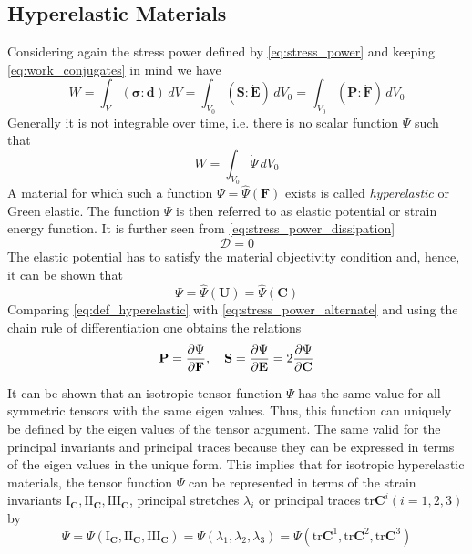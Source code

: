 \subsection{Hyperelastic Materials}
Considering again the stress power defined by \cref{eq:stress_power} and keeping \cref{eq:work_conjugates} in mind we have
\begin{equation}
    W = \int_{V}^{}\left(\bm{\sigma} : \mathbf{d}\right) \, dV 
      = \int_{V_0}^{}\left(\mathbf{S} : \dot{\mathbf{E}}\right) \, dV_{0}
      = \int_{V_0}^{}\left(\mathbf{P} : \dot{\mathbf{F}}\right) \, dV_{0} 
      \label{eq:stress_power_alternate}
\end{equation}
Generally it is not integrable over time, i.e. there is no scalar function \(\Psi\) such that 
\begin{equation}
    W = \int_{V_0}^{} \dot{\Psi} \, dV_{0}
    \label{eq:def_hyperelastic}
\end{equation}
A material for which such a function \(\Psi = \hat{\Psi}(\mathbf{F})\) exists is called \emph{hyperelastic} or Green elastic. The function \(\Psi\) is then referred to as elastic potential or strain energy function. It is further seen from \cref{eq:stress_power_dissipation}
\begin{equation}
    \mathcal{D} = 0
\end{equation}
The elastic potential has to satisfy the material objectivity condition and, hence, it can be shown that
\begin{equation}
    \Psi = \hat{\Psi}(\mathbf{U}) = \hat{\Psi}(\mathbf{C})
\end{equation}
Comparing \cref{eq:def_hyperelastic} with \cref{eq:stress_power_alternate} and using the chain rule of differentiation one obtains the relations
\begin{equation}
    \mathbf{P} = \pdv{\Psi}{\mathbf{F}}, \quad
    \mathbf{S} = \pdv{\Psi}{\mathbf{E}}
               = 2 \pdv{\Psi}{\mathbf{C}}
    \label{eq:stress_from_strain_energy}
\end{equation}

It can be shown that an isotropic tensor function \(\Psi\) has the same value for all symmetric tensors with the same eigen values. Thus, this function can uniquely be defined by the eigen values of the tensor argument. The same valid for the principal invariants and principal traces because they can be expressed in terms of the eigen values in the unique form. This implies that for isotropic hyperelastic materials, the tensor function \(\Psi\) can be represented in terms of the strain invariants \(\text{I}_{\mathbf{C}}, \text{II}_{\mathbf{C}}, \text{III}_{\mathbf{C}}\), principal stretches \(\lambda_{i}\) or principal traces tr\(\mathbf{C}^{i} (i=1,2,3)\) by
\begin{equation}
    \Psi = \Psi(\text{I}_{\mathbf{C}}, \text{II}_{\mathbf{C}}, \text{III}_{\mathbf{C}})
         = \Psi(\lambda_{1}, \lambda_{2}, \lambda_{3})
         = \Psi(\text{tr}\mathbf{C}^{1}, \text{tr}\mathbf{C}^{2}, \text{tr}\mathbf{C}^{3})
\end{equation}

